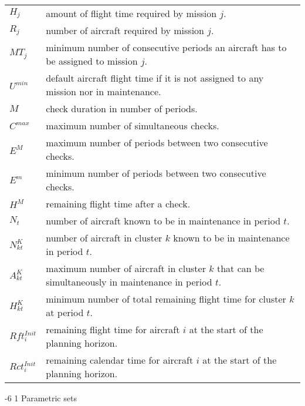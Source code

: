 \documentclass[a4paper,onecolumn,fleqn]{article}
\makeatletter
\renewcommand\subsubsection{\@startsection{subsubsection}{3}{\z@}%
                       {-6\p@ \@plus -0\p@ \@minus -0\p@}%
                       {1\p@ \@plus 0\p@ \@minus 0\p@}%
                       {\normalsize\itshape\bfseries}}
\makeatother
\begin{document}
        \begin{tabular}{p{10mm}p{115mm}}
            $H_j$             & amount of flight time required by mission $j$. \\
            $R_j$             & number of aircraft required by mission $j$. \\
            $MT_j$            & minimum number of consecutive periods an aircraft has to be assigned to mission $j$. \\
            $U^{min}$       & default aircraft flight time if it is not assigned to any mission nor in maintenance.\\
            $M$               & check duration in number of periods. \\
            $C^{max}$         & maximum number of simultaneous checks. \\
            $E^M$         & maximum number of periods between two consecutive checks. \\
            $E^m$         & minimum number of periods between two consecutive checks. \\
            $H^M$               & remaining flight time after a check. \\
            $N_t$             & number of aircraft known to be in maintenance in period $t$.\\
            $N^K_{kt}$         & number of aircraft in cluster $k$ known to be in maintenance in period $t$.\\
            $A^K_{kt}$         & maximum number of aircraft in cluster $k$ that can be simultaneously in maintenance in period $t$.\\
            $H^K_{kt}$         & minimum number of total remaining flight time for cluster $k$ at period $t$.\\
            $Rft^{Init}_i$  & remaining flight time for aircraft $i$ at the start of the planning horizon. \\
            $Rct^{Init}_i$  & remaining calendar time for aircraft $i$ at the start of the planning horizon. \\
        \end{tabular}

    \subsubsection{Parametric sets}
\end{document}
